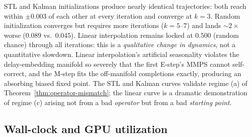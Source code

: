 \documentclass{article}
\theoremstyle{plain}
\theoremstyle{definition}
\theoremstyle{remark}
\begin{document}
\begin{table}[h]
\centering
\caption{Disc ($\downarrow$) per EM iteration under different initializations on Energy $50\%$.}
\label{tab:init}
\end{table}

STL and Kalman initializations produce nearly identical trajectories: both reach within $\pm 0.003$ of each other at every iteration and converge at $k = 3$. Random initialization converges but requires more iterations ($k = 5$--$7$) and lands $\sim 2\times$ worse ($0.089$ vs.\ $0.045$). Linear interpolation remains locked at $0.500$ (random chance) through all iterations: this is a \emph{qualitative change in dynamics}, not a quantitative slowdown. Linear interpolation's artificial seasonality violates the delay-embedding manifold so severely that the first E-step's MMPS cannot self-correct, and the M-step fits the off-manifold completions exactly, producing an absorbing biased fixed point. The STL and Kalman curves validate regime (a) of Theorem~\ref{thm:operator-mismatch}; the linear curve is a dramatic demonstration of regime (c) arising not from a bad \emph{operator} but from a bad \emph{starting point}.

\subsection{Wall-clock and GPU utilization}
\label{app:wallclock}
\end{document}
